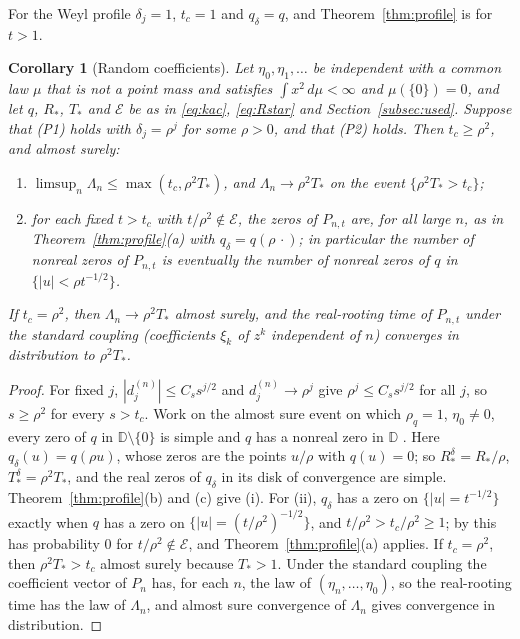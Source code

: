 \documentclass[11pt]{amsart}
\newtheorem{corollary}[theorem]{Corollary}
\theoremstyle{definition}
\theoremstyle{remark}
\numberwithin{equation}{section}
\newcommand{\D}{\mathbb{D}}
\begin{document}
For the Weyl profile $\delta_j=1$, $t_c=1$ and $q_\delta=q$, and Theorem~\ref{thm:profile} is \cite[Theorem~\ref{M-thm:fixedq}]{Main} for $t>1$.

\begin{corollary}[Random coefficients]\label{cor:profile-as}
Let $\eta_0,\eta_1,\dots$ be independent with a common law $\mu$ that is not a point mass and satisfies $\int x^2\,d\mu<\infty$ and $\mu(\{0\})=0$, and let $q$, $R_*$, $T_*$ and $\mathcal E$ be as in \eqref{eq:kac}, \eqref{eq:Rstar} and Section~\ref{subsec:used}. Suppose that (P1) holds with $\delta_j=\rho^j$ for some $\rho>0$, and that (P2) holds. Then $t_c\ge\rho^2$, and almost surely:
\begin{enumerate}
\item[(i)] $\limsup_n\Lambda_n\le\max(t_c,\rho^2T_*)$, and $\Lambda_n\to\rho^2T_*$ on the event $\{\rho^2T_*>t_c\}$;
\item[(ii)] for each fixed $t>t_c$ with $t/\rho^2\notin\mathcal E$, the zeros of $P_{n,t}$ are, for all large $n$, as in Theorem~\ref{thm:profile}(a) with $q_\delta=q(\rho\,\cdot)$; in particular the number of nonreal zeros of $P_{n,t}$ is eventually the number of nonreal zeros of $q$ in $\{|u|<\rho t^{-1/2}\}$.
\end{enumerate}
If $t_c=\rho^2$, then $\Lambda_n\to\rho^2T_*$ almost surely, and the real-rooting time of $P_{n,t}$ under the standard coupling (coefficients $\xi_k$ of $z^k$ independent of $n$) converges in distribution to $\rho^2T_*$.
\end{corollary}

\begin{proof}
For fixed $j$, $|d^{(n)}_j|\le C_ss^{j/2}$ and $d^{(n)}_j\to\rho^j$ give $\rho^j\le C_ss^{j/2}$ for all $j$, so $s\ge\rho^2$ for every $s>t_c$. Work on the almost sure event on which $\rho_q=1$, $\eta_0\ne0$, every zero of $q$ in $\D\setminus\{0\}$ is simple \cite[Lemma~\ref{M-lem:resample}]{Main} and $q$ has a nonreal zero in $\D$ \cite[Proposition~\ref{M-prop:nonreal}]{Main}. Here $q_\delta(u)=q(\rho u)$, whose zeros are the points $u/\rho$ with $q(u)=0$; so $R^\delta_*=R_*/\rho$, $T^\delta_*=\rho^2T_*$, and the real zeros of $q_\delta$ in its disk of convergence are simple. Theorem~\ref{thm:profile}(b) and (c) give (i). For (ii), $q_\delta$ has a zero on $\{|u|=t^{-1/2}\}$ exactly when $q$ has a zero on $\{|u|=(t/\rho^2)^{-1/2}\}$, and $t/\rho^2>t_c/\rho^2\ge1$; by \cite[Lemma~\ref{M-lem:circle}]{Main} this has probability $0$ for $t/\rho^2\notin\mathcal E$, and Theorem~\ref{thm:profile}(a) applies. If $t_c=\rho^2$, then $\rho^2T_*>t_c$ almost surely because $T_*>1$. Under the standard coupling the coefficient vector of $P_n$ has, for each $n$, the law of $(\eta_n,\dots,\eta_0)$, so the real-rooting time has the law of $\Lambda_n$, and almost sure convergence of $\Lambda_n$ gives convergence in distribution.
\end{proof}
\end{document}
